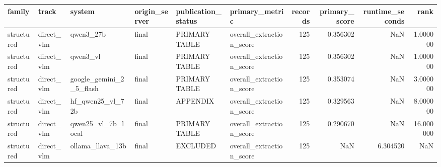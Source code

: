 \begin{tabular}{llllllrrrr}
\toprule
family & track & system & origin\_server & publication\_status & primary\_metric & records & primary\_score & runtime\_seconds & rank \\
\midrule
structured & direct\_vlm & qwen3\_27b & final & PRIMARY TABLE & overall\_extraction\_score & 125 & 0.356302 & NaN & 1.000000 \\
structured & direct\_vlm & qwen3\_vl & final & PRIMARY TABLE & overall\_extraction\_score & 125 & 0.356302 & NaN & 1.000000 \\
structured & direct\_vlm & google\_gemini\_2\_5\_flash & final & PRIMARY TABLE & overall\_extraction\_score & 125 & 0.353074 & NaN & 3.000000 \\
structured & direct\_vlm & hf\_qwen25\_vl\_72b & final & APPENDIX & overall\_extraction\_score & 125 & 0.329563 & NaN & 8.000000 \\
structured & direct\_vlm & qwen25\_vl\_7b\_local & final & PRIMARY TABLE & overall\_extraction\_score & 125 & 0.290670 & NaN & 16.000000 \\
structured & direct\_vlm & ollama\_llava\_13b & final & EXCLUDED & overall\_extraction\_score & 125 & NaN & 6.304520 & NaN \\
\bottomrule
\end{tabular}
